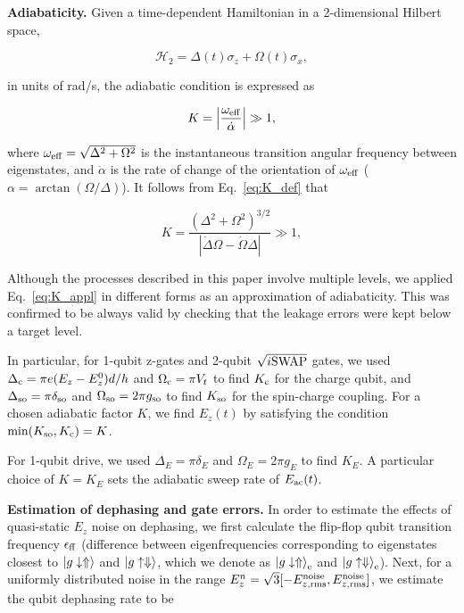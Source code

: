 \documentclass[aps,prb,superscriptaddress,nobibnotes,twocolumn]{revtex4-1}
\begin{document}
{\small
\noindent\textbf{Adiabaticity.}
%
Given a time-dependent Hamiltonian in a 2-dimensional Hilbert space,

\begin{equation}
\mathcal{H}_2=\Delta(t)\sigma_z+\Omega(t)\sigma_x,
\end{equation}

in units of rad/s, the adiabatic condition is expressed as \cite{Garwood2001}

\begin{equation} \label{eq:K_def}
K=\left|\frac{\omega_{\rm eff}}{\dot{\alpha}}\right|\gg1,
\end{equation}

where $\omega_{\rm eff}=\sqrt{\Delta^2+\Omega^2}$ is the instantaneous transition angular frequency between eigenstates, and $\dot{\alpha}$ is the rate of change of the orientation of $\omega_{\rm eff}$ ($\alpha=\arctan{(\Omega/\Delta)}$). It follows from Eq.~\ref{eq:K_def} that

\begin{equation} \label{eq:K_appl}
K=\frac{\left(\Delta^2+\Omega^2\right)^{3/2}}{|\dot{\Delta}\Omega-\dot{\Omega}\Delta|}\gg1,
\end{equation}

Although the processes described in this paper involve multiple levels, we applied Eq.~\ref{eq:K_appl} in different forms as an approximation of adiabaticity. This was confirmed to be always valid by checking that the leakage errors were kept below a target level.

In particular, for 1-qubit z-gates and 2-qubit $\sqrt{i{\rm SWAP}}$ gates, we used $\Delta_{\rm c}=\pi e(E_z - E_z^0)d/h$ and $\Omega_{\rm c}=\pi V_t$ to find $K_{\rm c}$ for the charge qubit, and $\Delta_{\rm so}=\pi\delta_{\rm so}$ and $\Omega_{\rm so}=2\pi g_{\rm so}$ to find $K_{\rm so}$ for the spin-charge coupling. For a chosen adiabatic factor $K$, we find $E_z(t)$ by satisfying the condition $\min(K_{\rm so},K_{\rm c})=K$.

For 1-qubit drive, we used $\Delta_E=\pi\delta_E$ and $\Omega_{E}=2\pi g_E$ to find $K_E$. A particular choice of $K=K_E$ sets the adiabatic sweep rate of $E_{\rm ac}(t)$.


\vspace{3mm}
\noindent\textbf{Estimation of dephasing and gate errors.}
%
In order to estimate the effects of quasi-static $E_z$ noise on dephasing, we first calculate the flip-flop qubit transition frequency $\epsilon_{\rm ff}$ (difference between eigenfrequencies corresponding to eigenstates closest to $\ket{g\downarrow\Uparrow}$ and $\ket{g\uparrow\Downarrow}$, which we denote as $\ket{g\downarrow\Uparrow}_{\rm e}$ and $\ket{g\uparrow\Downarrow}_{\rm e}$). Next, for a uniformly distributed noise in the range $E_z^n=\sqrt{3}[-E_{z,\rm rms}^{\rm noise},E_{z,\rm rms}^{\rm noise}]$, we estimate the qubit dephasing rate to be 

}
\end{document}

